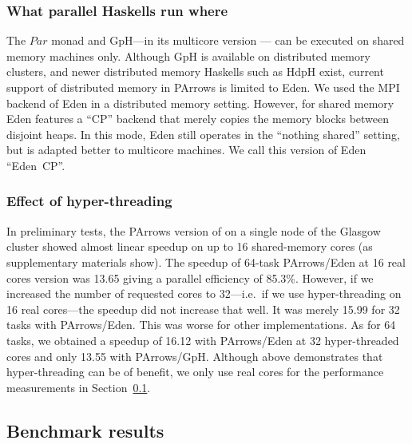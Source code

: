 \documentclass{jfp1}
\newcommand{\Conid}[1]{\mathit{#1}}
\renewcommand{\cite}[1]{\citep{#1}}
\DeclareRobustCommand{\hairspn}{\hspace{1pt}\nolinebreak}%
\DeclareRobustCommand{\ie}{{i.\hairspn{}e.~}}
\begin{document}
\subsubsection{What parallel Haskells run where}

The \ensuremath{\Conid{Par}} monad and GpH---in its multicore version \cite{Marlow2009}--- can be executed on shared memory machines only.
Although GpH is available on distributed memory
clusters, and newer distributed memory Haskells such as HdpH exist,
current support of distributed memory in PArrows is limited to
Eden. We used the MPI backend of Eden in a distributed memory
setting. However, for shared memory Eden features a \enquote{CP} backend
that merely copies the memory blocks between disjoint heaps. In
this mode, Eden still operates in the \enquote{nothing shared} setting, but
is adapted better to multicore machines. We call this version of Eden
\enquote{Eden~CP}.



\subsubsection{Effect of hyper-threading}

In preliminary tests, the PArrows version of \rmtest on a single node of the Glasgow cluster
showed almost linear speedup on up to 16 shared-memory cores (as supplementary materials show). The speedup
of 64-task PArrows/Eden at 16 real cores version was 13.65 giving a parallel
efficiency of 85.3\%. However, if we increased the number of
requested cores to 32---\ie if we use hyper-threading on 16 real
cores---the speedup did not increase that well. It was merely 15.99
for 32 tasks with PArrows/Eden. This was worse for other implementations.  As
for 64 tasks, we obtained a speedup of 16.12 with PArrows/Eden at 32
hyper-threaded cores and only 13.55 with PArrows/GpH. 
Although above demonstrates that hyper-threading can be of benefit, we only use real cores for the performance measurements in Section~\ref{sec:benchmarkResults}.




\subsection{Benchmark results}\label{sec:benchmarkResults}
\end{document}

